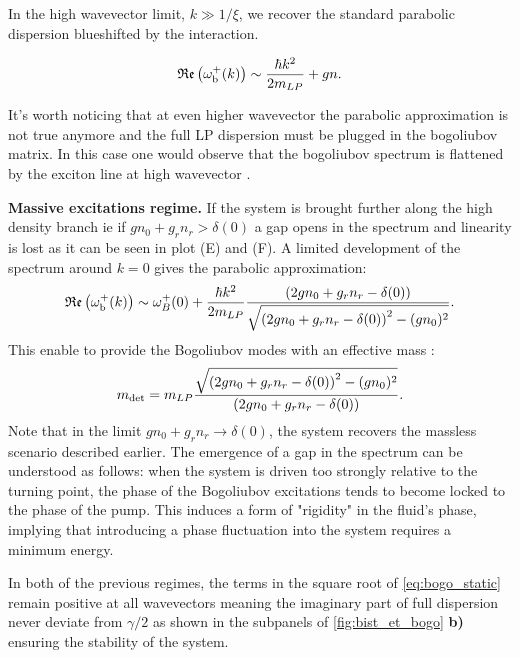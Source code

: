 \bigskip

In the high wavevector limit, $k \gg 1/\xi $, we recover the standard parabolic dispersion blueshifted by the interaction.

\begin{equation}
    \mathfrak{Re}\left(\omega_{\mathrm{b}}^+(k)\right) \sim \dfrac{\hbar k^2}{2m_{LP}} + g n.
\end{equation}

It's worth noticing that at even higher wavevector the parabolic approximation is not true anymore and the full LP dispersion must be plugged in the bogoliubov matrix. In this case one would observe that the bogoliubov spectrum is flattened
by the exciton line at high wavevector \cite{I_frerot_PRX_2023}.

\bigskip

\textbf{Massive excitations regime.} If the system is brought further along the high density branch ie if $gn_0+g_rn_r>\delta(0)$ a gap opens in the spectrum and linearity is lost as it can be seen 
in plot (E) and (F). A limited development of the spectrum around $k=0$ gives the parabolic approximation:
\begin{equation}
    \mathfrak{Re}\left(\omega_{\mathrm{b}}^+(k)\right) \sim \omega^+_B(0) + \dfrac{\hbar k^2}{2m_{LP}}\dfrac{\left(2g n_0 + g_r n_r - \delta(0)\right)}{\sqrt{\left(2g n_0 + g_r n_r - \delta(0)\right)^2 - (g n_0)^2}}.
\end{equation}
This enable to provide the Bogoliubov modes with an effective mass :
\begin{equation}
    m_{\mathrm{det}}= m_{LP}\dfrac{\sqrt{\left(2g n_0 + g_r n_r - \delta(0)\right)^2 - (g n_0)^2}}{\left(2g n_0 + g_r n_r - \delta(0)\right)}.
\end{equation}
Note that in the limit $gn_0+g_rn_r\to \delta(0)$, the system recovers the massless scenario described earlier. 
The emergence of a gap in the spectrum can be understood as follows: when the system is driven too strongly relative to the turning point, the phase of the Bogoliubov excitations tends to become locked to the phase of the pump. 
This induces a form of "rigidity" in the fluid's phase, implying that introducing a phase fluctuation into the system requires a minimum energy.

\bigskip

In both of the previous regimes, the terms in the square root of \autoref{eq:bogo_static} remain positive at all wavevectors meaning the imaginary part of 
full dispersion never deviate from $\gamma/2$ as shown in the subpanels of \autoref{fig:bist_et_bogo} \textbf{b)} ensuring the stability of the system.

